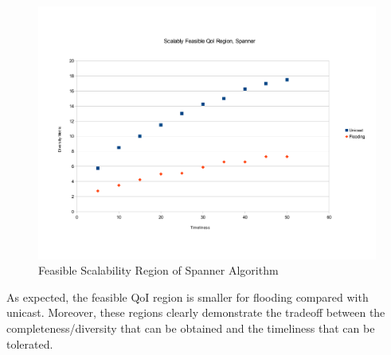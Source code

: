 \begin{figure}
    \includegraphics[scale=0.35]{figures/spanScalR.pdf}
    \caption{Feasible Scalability Region of Spanner Algorithm}
    \label{fig:spanScalR}
\end{figure}

As expected, the feasible QoI region is smaller for flooding compared with unicast. Moreover, these regions clearly demonstrate the tradeoff between the completeness/diversity that can be obtained and the timeliness that can be tolerated. 
